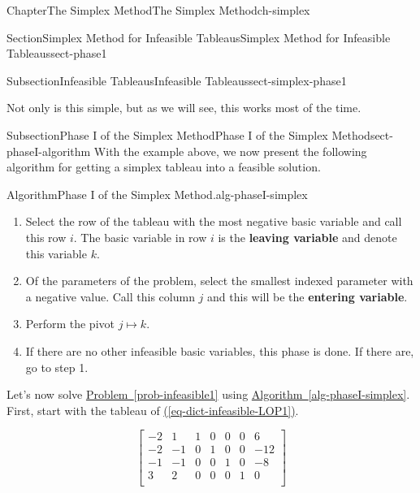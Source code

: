 \documentclass[oneside,10pt,]{book}
\newcommand{\xreffont}{\relax}
\newcommand{\terminology}[1]{\textbf{#1}}
\numberwithin{equation}{section}
\newcommand{\amp}{&}
\begin{document}
\begin{chapterptx}{Chapter}{The Simplex Method}{}{The Simplex Method}{}{}{ch-simplex}
\begin{sectionptx}{Section}{Simplex Method for Infeasible Tableaus}{}{Simplex Method for Infeasible Tableaus}{}{}{sect-phase1}
\begin{subsectionptx}{Subsection}{Infeasible Tableaus}{}{Infeasible Tableaus}{}{}{sect-simplex-phase1}
\par
Not only is this simple, but as we will see, this works most of the time.%
\end{subsectionptx}
%
%
\typeout{************************************************}
\typeout{************************************************}
%
\begin{subsectionptx}{Subsection}{Phase I of the Simplex Method}{}{Phase I of the Simplex Method}{}{}{sect-phaseI-algorithm}
With the example above, we now present the following algorithm for getting a simplex tableau into a feasible solution.%
\begin{algorithm}{Algorithm}{Phase I of the Simplex Method.}{}{alg-phaseI-simplex}%
%
\begin{enumerate}
\item{}Select the row of the tableau with the most negative basic variable and call this row \(i\). The basic variable in row \(i\) is the \terminology{leaving variable} and denote this variable \(k\).%
\item{}Of the parameters of the problem, select the smallest indexed parameter with a negative value. \footnotemark{} Call this column \(j\) and this will be the \terminology{entering variable}.%
\item{}Perform the pivot \(j \mapsto k\).%
\item{}If there are no other infeasible basic variables, this phase is done. If there are, go to step 1.%
\end{enumerate}
%
\end{algorithm}
%
Let's now solve \hyperref[prob-infeasible1]{Problem~{\xreffont\ref{prob-infeasible1}}} using \hyperref[alg-phaseI-simplex]{Algorithm~{\xreffont\ref{alg-phaseI-simplex}}}. First, start with the tableau of \hyperref[eq-dict-infeasible-LOP1]{({\xreffont\ref{eq-dict-infeasible-LOP1}})}.%
\par
%
\begin{equation*}
\left[\begin{array}{rr|rrrr|r} -2 \amp 1 \amp 1 \amp 0 \amp 0 \amp 0 \amp 6\\ -2 \amp -1 \amp 0 \amp 1 \amp 0 \amp 0 \amp -12\\ -1 \amp -1 \amp 0 \amp 0 \amp 1 \amp 0 \amp -8\\ \hline 3 \amp 2 \amp 0 \amp 0 \amp 0 \amp 1 \amp 0\\ \end{array} \right]

\end{equation*}
\end{subsectionptx}
\end{sectionptx}
\end{chapterptx}
\end{document}
